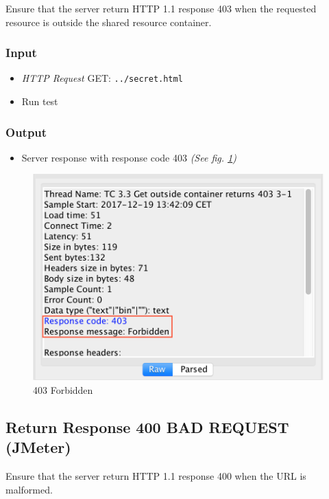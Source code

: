 \documentclass[a4paper, 12pt]{article}
\begin{document}
Ensure that the server return HTTP 1.1 response 403 when the requested resource is outside the shared resource container.

\subsubsection{Input}
\begin{itemize}
\item \textit{HTTP Request} GET: \texttt{../secret.html}
\item Run test
\end{itemize}

\subsubsection{Output}
\begin{itemize}
\item Server response with response code 403 \textit{(See fig. \ref{TC3.3})}
\end{itemize}

\begin{figure}[H]
\includegraphics[scale=0.7]{output_clarification/403FORBIDDEN.png} 
\caption{403 Forbidden}
\label{TC3.3}
\end{figure}

\subsection{Return Response 400 BAD REQUEST (JMeter)}

Ensure that the server return HTTP 1.1 response 400 when the URL is malformed.
\end{document}
